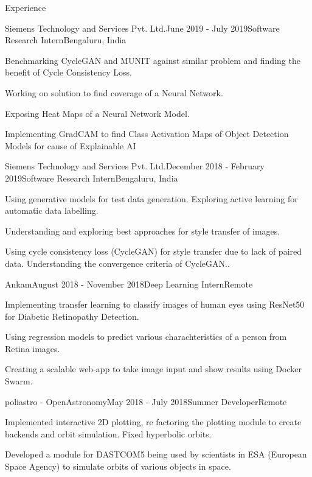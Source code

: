 \documentclass{resume} %
\begin{document}
\begin{rSection}{Experience}

\begin{rSubsection}{Siemens Technology and Services Pvt. Ltd.}{June 2019 - July 2019}{Software Research Intern}{Bengaluru, India}
\item Benchmarking CycleGAN and MUNIT against similar problem and finding the benefit of Cycle Consistency Loss.
\item Working on solution to find coverage of a Neural Network.
\item Exposing Heat Maps of a Neural Network Model.
\item Implementing GradCAM to find Class Activation Maps of Object Detection Models for cause of Explainable AI
\end{rSubsection}


\begin{rSubsection}{Siemens Technology and Services Pvt. Ltd.}{December 2018 - February 2019}{Software Research Intern}{Bengaluru, India}
\item Using generative models for test data generation. Exploring active learning
for automatic data labelling.
\item Understanding and exploring best approaches for style transfer of images.
\item Using cycle consistency loss (CycleGAN) for style transfer due to lack of paired data. Understanding the convergence criteria of CycleGAN..
\end{rSubsection}


\begin{rSubsection}{Ankam}{August 2018 - November 2018}{Deep Learning Intern}{Remote}
\item Implementing transfer learning to classify images of human eyes using
ResNet50 for Diabetic Retinopathy Detection.
\item Using regression models to predict various charachteristics of a person from Retina images. 
\item Creating a scalable web-app to take image input and show results using Docker Swarm.
\end{rSubsection}


\begin{rSubsection}{poliastro - OpenAstronomy}{May 2018 - July 2018}{Summer Developer}{Remote}
\item Implemented interactive 2D plotting, re factoring the plotting module to
create backends and orbit simulation. Fixed hyperbolic orbits.
\item Developed a module for DASTCOM5 being used by scientists in ESA (European Space Agency) to simulate orbits of various objects in space.
\end{rSubsection}

\end{rSection}
\end{document}
